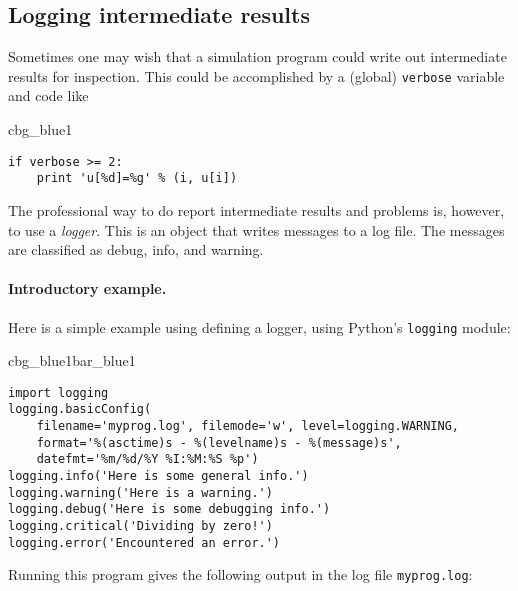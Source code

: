 \documentclass[graybox,sectrefs,envcountresetchap,open=right,final]{svmonodo}
\newenvironment{_cod_tight}[1]{
   \def\FrameCommand{\colorbox{#1}}
   \FrameRule0.6pt\MakeFramed {\FrameRestore}\vskip3mm}
   {\vskip0mm\endMakeFramed}
\newenvironment{cod}[1]{
\bgroup\rmfamily
\fboxsep=0mm\relax
\begin{_cod_tight}{#1}
\list{}{\parsep=-2mm\parskip=0mm\topsep=0pt\leftmargin=2mm
\rightmargin=2\leftmargin\leftmargin=4pt\relax}
\item\relax}
{\endlist\end{_cod_tight}\egroup}
\newenvironment{_pro_tight}[2]{
   \def\FrameCommand{\color{#2}\vrule width 1mm\normalcolor\colorbox{#1}}
   \FrameRule0.6pt\MakeFramed {\advance\hsize-2mm\FrameRestore}\vskip3mm}
   {\vskip0mm\endMakeFramed}
\newenvironment{pro}[2]{
\bgroup\rmfamily
\fboxsep=0mm\relax
\begin{_pro_tight}{#1}{#2}
\list{}{\parsep=-2mm\parskip=0mm\topsep=0pt\leftmargin=2mm
\rightmargin=2\leftmargin\leftmargin=4pt\relax}
\item\relax}
{\endlist\end{_pro_tight}\egroup}
\begin{document}
\subsection{Logging intermediate results}
\label{softeng1:basic:logging}


Sometimes one may wish that a simulation program could write out
intermediate results for inspection. This could be accomplished by
a (global) \texttt{verbose} variable and code like

\begin{cod}{cbg_blue1}\begin{Verbatim}[numbers=none,fontsize=\fontsize{9pt}{9pt},baselinestretch=0.95,xleftmargin=2mm]
if verbose >= 2:
    print 'u[%d]=%g' % (i, u[i])
\end{Verbatim}
\end{cod}
\noindent
The professional way to do report intermediate results and problems is,
however, to use a \emph{logger}. This is an object that writes messages
to a log file. The messages are classified as debug, info, and warning.

\paragraph{Introductory example.}
Here is a simple example using defining a logger, using Python's \texttt{logging}
module:

\begin{pro}{cbg_blue1}{bar_blue1}\begin{Verbatim}[numbers=none,fontsize=\fontsize{9pt}{9pt},baselinestretch=0.95,xleftmargin=2mm]
import logging
logging.basicConfig(
    filename='myprog.log', filemode='w', level=logging.WARNING,
    format='%(asctime)s - %(levelname)s - %(message)s',
    datefmt='%m/%d/%Y %I:%M:%S %p')
logging.info('Here is some general info.')
logging.warning('Here is a warning.')
logging.debug('Here is some debugging info.')
logging.critical('Dividing by zero!')
logging.error('Encountered an error.')
\end{Verbatim}
\end{pro}
\noindent
Running this program gives the following output in the log file \texttt{myprog.log}:
\end{document}
